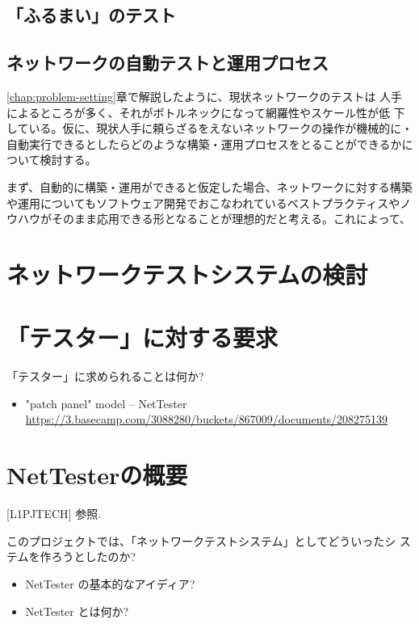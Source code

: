   \subsection{「ふるまい」のテスト}


  \subsection{ネットワークの自動テストと運用プロセス}


\ref{chap:problem-setting}章で解説したように、現状ネットワークのテストは
人手によるところが多く、それがボトルネックになって網羅性やスケール性が低
下している。仮に、現状人手に頼らざるをえないネットワークの操作が機械的に・
自動実行できるとしたらどのような構築・運用プロセスをとることができるかに
ついて検討する。

まず、自動的に構築・運用ができると仮定した場合、ネットワークに対する構築
や運用についてもソフトウェア開発でおこなわれているベストプラクティスやノ
ウハウがそのまま応用できる形となることが理想的だと考える。これによって、


 \section{ネットワークテストシステムの検討}


 \section{「テスター」に対する要求}

「テスター」に求められることは何か?
\begin{itemize}
 \item "patch panel" model – NetTester \url{https://3.basecamp.com/3088280/buckets/867009/documents/208275139}
\end{itemize}

\section{NetTesterの概要}

[L1PJTECH] 参照.

このプロジェクトでは、「ネットワークテストシステム」としてどういったシ
ステムを作ろうとしたのか?

\begin{itemize}
 \item NetTester の基本的なアイディア?
 \item NetTester とは何か?
\end{itemize}


